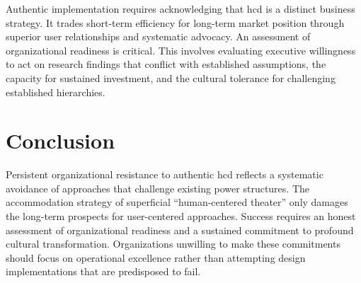 \documentclass[11pt,showkeys]{../../shared/essay}
\begin{document}
Authentic implementation requires acknowledging that \gls{hcd} is a distinct business strategy. It trades short-term efficiency for long-term market position through superior user relationships and systematic advocacy. An assessment of organizational readiness is critical. This involves evaluating executive willingness to act on research findings that conflict with established assumptions, the capacity for sustained investment, and the cultural tolerance for challenging established hierarchies.

\section{Conclusion}

Persistent organizational resistance to authentic \gls{hcd} reflects a systematic avoidance of approaches that challenge existing power structures. The accommodation strategy of superficial ``human-centered theater'' only damages the long-term prospects for user-centered approaches. Success requires an honest assessment of organizational readiness and a sustained commitment to profound cultural transformation. Organizations unwilling to make these commitments should focus on operational excellence rather than attempting design implementations that are predisposed to fail.


\end{document}

